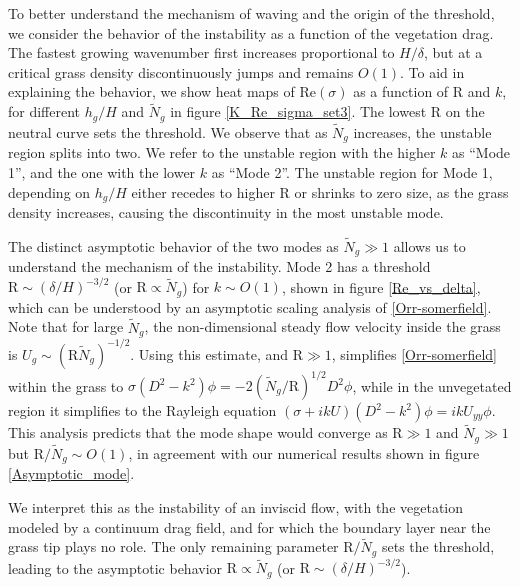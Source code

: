 \documentclass[aps,prl,reprint,twocolumn,showpacs,superscriptaddress,10pt]{revtex4-1}  %
\newcommand{\hg}{h_g}
\newcommand{\Rey}{\text{R}}
\newcommand{\Ndg}{\tilde{N}_g}
\begin{document}
To better understand the mechanism of waving and the origin of the threshold, we consider the behavior of the instability as a function of the vegetation drag.
The fastest growing wavenumber first increases proportional to $H/\delta$, but at a critical grass density discontinuously jumps and remains $O(1)$. 
To aid in explaining the behavior, we show heat maps of Re$(\sigma)$ as a function of $\Rey$ and $k$, for different $\hg/H$ and $\Ndg$ in figure \ref{K_Re_sigma_set3}. 
The lowest $\Rey$ on the neutral curve sets the threshold. 
We observe that as $\Ndg$ increases, the unstable region splits into two. We refer to the unstable region with the higher $k$ as ``Mode 1'', and the one with the lower $k$ as ``Mode 2''. 
The unstable region for Mode 1, depending on $\hg/H$ either recedes to higher $\Rey$ or shrinks to zero size, as the grass density increases, causing the discontinuity in the most unstable mode.

The distinct asymptotic behavior of the two modes as $\Ndg \gg 1$ allows us to understand the mechanism of the instability. 
Mode 2 has a threshold $\Rey \sim ({\delta}/{H})^{-3/2}$ (or $\Rey \propto \Ndg$) for $k\sim O(1)$, shown in figure \ref{Re_vs_delta}, which can be understood by an asymptotic scaling analysis of \eqref{Orr-somerfield}.
Note that for large $\Ndg$, the non-dimensional steady flow velocity inside the grass is $U_g \sim (\Rey \Ndg)^{-1/2}$. 
Using this estimate, and $\Rey\gg 1$, simplifies \eqref{Orr-somerfield} within the grass to $\sigma\left(D^2-k^2\right)\phi = -2{(\Ndg/\Rey)^{1/2}}D^2\phi$, while in the unvegetated region it simplifies to the Rayleigh equation $ \left(\sigma+ikU\right) \left(D^2-k^2\right)\phi =  ikU_{yy}\phi$. 
This analysis predicts that the mode shape would converge as $\Rey\gg 1$ and $\Ndg \gg 1$ but $\Rey/\Ndg \sim O(1)$, in agreement with our numerical results shown in figure \ref{Asymptotic_mode}. 


We interpret this as the instability of an inviscid flow, with the vegetation modeled by a continuum drag field, and for which the boundary layer near the grass tip plays no role. The only remaining parameter $\Rey/\Ndg$ sets the threshold, leading to the asymptotic behavior $\Rey \propto \Ndg$ (or $\Rey \sim ({\delta}/{H})^{-3/2}$).
\end{document}
